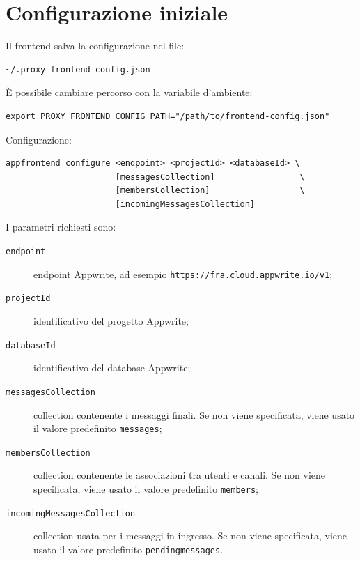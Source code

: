 \documentclass[a4paper, 11pt, twoside]{report}
\begin{document}
\section{Configurazione iniziale}

Il frontend salva la configurazione nel file:
\begin{verbatim}
~/.proxy-frontend-config.json
\end{verbatim}

\noindent È possibile cambiare percorso con la variabile d'ambiente:
\begin{verbatim}
export PROXY_FRONTEND_CONFIG_PATH="/path/to/frontend-config.json"
\end{verbatim}

\noindent Configurazione:
\begin{verbatim}
appfrontend configure <endpoint> <projectId> <databaseId> \
                      [messagesCollection]                 \
                      [membersCollection]                  \
                      [incomingMessagesCollection]
\end{verbatim}

\newpage

\noindent I parametri richiesti sono:
\begin{description}
    \item[\texttt{endpoint}] endpoint Appwrite, ad esempio \texttt{https://fra.cloud.appwrite.io/v1};

    \item[\texttt{projectId}] identificativo del progetto Appwrite;

    \item[\texttt{databaseId}] identificativo del database Appwrite;

    \item[\texttt{messagesCollection}] collection contenente i messaggi finali.
    Se non viene specificata, viene usato il valore predefinito \texttt{messages};

    \item[\texttt{membersCollection}] collection contenente le associazioni tra utenti e canali.
    Se non viene specificata, viene usato il valore predefinito \texttt{members};

    \item[\texttt{incomingMessagesCollection}] collection usata per i messaggi in ingresso.
    Se non viene specificata, viene usato il valore predefinito \texttt{pendingmessages}.
\end{description}
\end{document}
